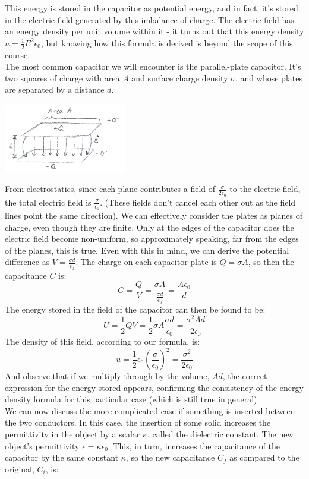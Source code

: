 This energy is stored in the capacitor as potential energy, and in fact, it's stored in the electric field generated by this imbalance of charge. The electric field has an energy density per unit volume within it - it turns out that this energy density $u = \frac{1}{2}E^2 \epsilon_0$, but knowing how this formula is derived is beyond the scope of this course.\\
The most common capacitor we will encounter is the parallel-plate capacitor. It's two squares of charge with area $A$ and surface charge density $\sigma$, and whose plates are separated by a distance $d$.
\begin{center}
	\includegraphics[width=0.4\textwidth]{images/em/capacitor.png}
\end{center}
From electrostatics, since each plane contributes a field of $\frac{\sigma}{2\epsilon_0}$ to the electric field, the total electric field is $\frac{\sigma}{\epsilon_0}$. (These fields don't cancel each other out as the field lines point the same direction). We can effectively consider the plates as planes of charge, even though they are finite. Only at the edges of the capacitor does the electric field become non-uniform, so approximately speaking, far from the edges of the planes, this is true. Even with this in mind, we can derive the potential difference as $V = \frac{\sigma d}{\epsilon_0}$. The charge on each capacitor plate is $Q = \sigma A$, so then the capacitance $C$ is:
\[
	C = \frac{Q}{V} = \frac{\sigma A}{\frac{\sigma d}{\epsilon_0}} = \frac{A \epsilon_0}{d}
\]
The energy stored in the field of the capacitor can then be found to be:
\[
	U = \frac{1}{2}QV = \frac{1}{2} \sigma A \frac{\sigma d}{\epsilon_0} = \frac{\sigma^2 Ad}{2\epsilon_0}
\]
The density of this field, according to our formula, is:
\[
	u = \frac{1}{2} \epsilon_0 \left(\frac{\sigma}{\epsilon_0}\right)^2 = \frac{\sigma^2}{2\epsilon_0}
\]
And observe that if we multiply through by the volume, $Ad$, the correct expression for the energy stored appears, confirming the consistency of the energy density formula for this particular case (which is still true in general). \\
We can now discuss the more complicated case if something is inserted between the two conductors. In this case, the insertion of some solid increases the permittivity in the object by a scalar $\kappa$, called the dielectric constant. The new object's permittivity $\epsilon = \kappa \epsilon_0$. This, in turn, increases the capacitance of the capacitor by the same constant $\kappa$, so the new capacitance $C_f$ as compared to the original, $C_i$, is:
